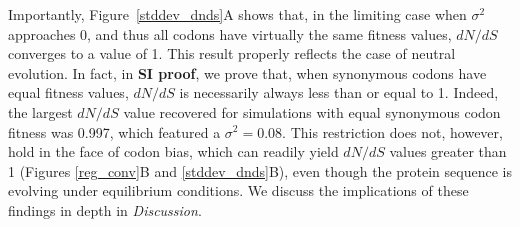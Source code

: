 \documentclass[11pt]{article}
\begin{document}
Importantly, Figure~\ref{stddev_dnds}A shows that, in the limiting case when $\sigma^2$ approaches 0, and thus all codons have virtually the same fitness values, $dN/dS$ converges to a value of 1. This result properly reflects the case of neutral evolution. In fact, in \textbf{SI proof}, we prove that, when synonymous codons have equal fitness values, $dN/dS$ is necessarily always less than or equal to 1. Indeed, the largest $dN/dS$ value recovered for simulations with equal synonymous codon fitness was 0.997, which featured a $\sigma^2 = 0.08$. This restriction does not, however, hold in the face of codon bias, which can readily yield $dN/dS$ values greater than 1 (Figures \ref{reg_conv}B and \ref{stddev_dnds}B), even though the protein sequence is evolving under equilibrium conditions. We discuss the implications of these findings in depth in \textit{Discussion}.
\end{document}
